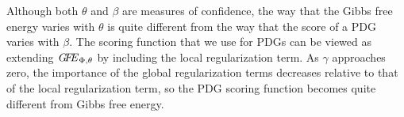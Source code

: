 \documentclass[letterpaper]{article} %
\theoremstyle{plain}
\theoremstyle{definition}
\theoremstyle{remark}
\newcommand\GFE{\mathit{G\mkern-4mu F\mkern-4.5mu E}}
\begin{document}
Although both $\theta$ and $\beta$ are measures of confidence, 
the way that the Gibbs free energy varies with $\theta$ 
is quite different from the way that the score of a PDG
varies with $\beta$. 
The scoring function that we use for PDGs can be viewed as
extending ${\GFE}_{\Phi,\theta}$ by including
the local regularization term.
As $\gamma$ approaches zero,
the importance of the global regularization terms decreases relative
to that of the local regularization term, so the PDG scoring function
becomes quite different from Gibbs free energy.
\end{document}
